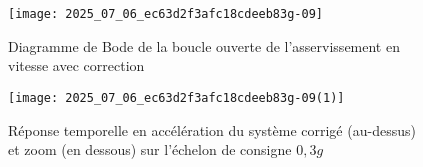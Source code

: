 


\begin{figure}[!h]
\centering
\texttt{[image: 2025\_07\_06\_ec63d2f3afc18cdeeb83g-09]}

\caption{\label{ccs_mp_2022_fig_11}Diagramme de Bode de la boucle ouverte de l'asservissement en vitesse avec correction}
\end{figure}

\begin{figure}[!h]
\centering
\texttt{[image: 2025\_07\_06\_ec63d2f3afc18cdeeb83g-09(1)]}

\caption{\label{ccs_mp_2022_fig_12}Réponse temporelle en accélération du système corrigé (au-dessus) et zoom (en dessous) sur l'échelon de consigne $0,3 g$}
\end{figure}

